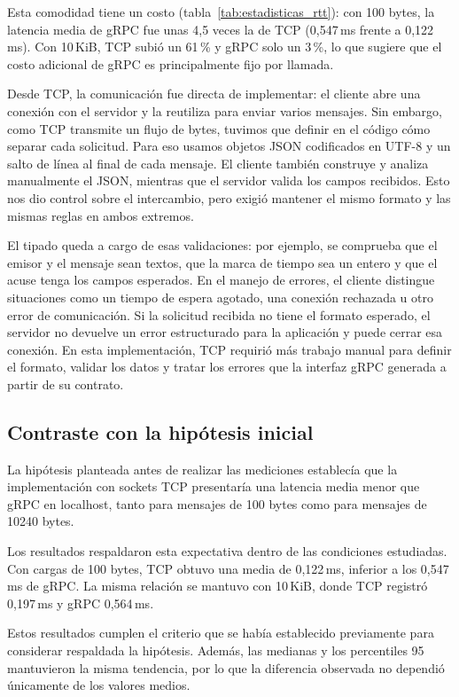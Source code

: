 Esta comodidad tiene un costo (tabla~\ref{tab:estadisticas_rtt}): con 100 bytes, la latencia media de gRPC fue unas 4,5 veces la de TCP (0,547\,ms frente a 0,122\,ms). Con 10\,KiB, TCP subió un 61\,\% y gRPC solo un 3\,\%, lo que sugiere que el costo adicional de gRPC es principalmente fijo por llamada.

Desde TCP, la comunicación fue directa de implementar: el cliente abre una conexión con el servidor y la reutiliza para enviar varios mensajes. Sin embargo, como TCP transmite un flujo de bytes, tuvimos que definir en el código cómo separar cada solicitud. Para eso usamos objetos JSON codificados en UTF-8 y un salto de línea al final de cada mensaje. El cliente también construye y analiza manualmente el JSON, mientras que el servidor valida los campos recibidos. Esto nos dio control sobre el intercambio, pero exigió mantener el mismo formato y las mismas reglas en ambos extremos.

El tipado queda a cargo de esas validaciones: por ejemplo, se comprueba que el emisor y el mensaje sean textos, que la marca de tiempo sea un entero y que el acuse tenga los campos esperados. En el manejo de errores, el cliente distingue situaciones como un tiempo de espera agotado, una conexión rechazada u otro error de comunicación. Si la solicitud recibida no tiene el formato esperado, el servidor no devuelve un error estructurado para la aplicación y puede cerrar esa conexión. En esta implementación, TCP requirió más trabajo manual para definir el formato, validar los datos y tratar los errores que la interfaz gRPC generada a partir de su contrato.

\subsection{Contraste con la hipótesis inicial}

La hipótesis planteada antes de realizar las mediciones
establecía que la implementación con sockets TCP
presentaría una latencia media menor que gRPC en
localhost, tanto para mensajes de 100 bytes como
para mensajes de 10240 bytes.

Los resultados respaldaron esta expectativa dentro
de las condiciones estudiadas. Con cargas de 100 bytes,
TCP obtuvo una media de 0,122\,ms, inferior a los
0,547\,ms de gRPC. La misma relación se mantuvo
con 10\,KiB, donde TCP registró 0,197\,ms y
gRPC 0,564\,ms.

Estos resultados cumplen el criterio que se había
establecido previamente para considerar respaldada
la hipótesis. Además, las medianas y los percentiles
95 mantuvieron la misma tendencia, por lo que la
diferencia observada no dependió únicamente de
los valores medios.

